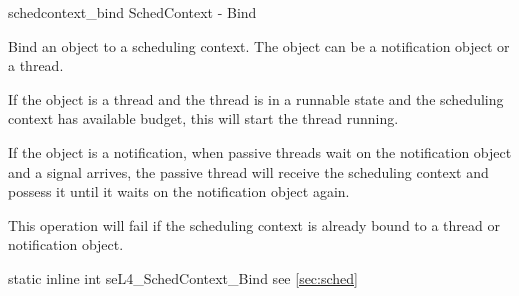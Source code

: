 %
%
%
%

\apidoc
{schedcontext_bind}
{SchedContext - Bind}
{Bind an object to a scheduling context. The object can be a notification object or a thread.
    
    If the object is a thread and the thread is in a runnable state and the scheduling context has available budget, this will start the thread running.
    
    If the object is a notification, when passive threads wait on the notification object and a signal arrives, the passive thread will receive the scheduling context and possess it until it waits on the notification object again.
    
    This operation will fail if the scheduling context is already bound to a thread or notification object. 
    }
{static inline int seL4\_SchedContext\_Bind}
{
}
{\errorenumdesc}
{see \autoref{sec:sched}}
